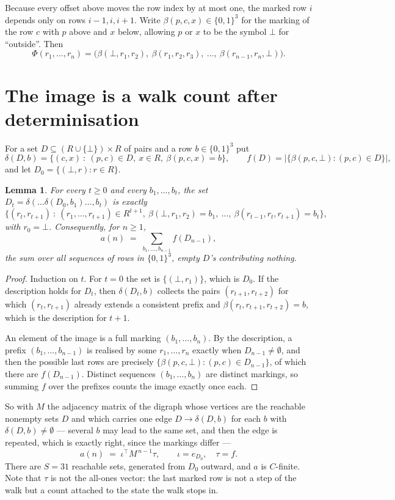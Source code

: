 \documentclass[11pt,a4paper]{article}
\theoremstyle{plain}
\newtheorem{lemma}[theorem]{Lemma}
\theoremstyle{definition}
\begin{document}
Because every offset above moves the row index by at most one, the marked row $i$ depends only
on rows $i-1,i,i+1$. Write $\beta(p,c,x)\in\{0,1\}^{3}$ for the marking of the row $c$
with $p$ above and $x$ below, allowing $p$ or $x$ to be the symbol $\bot$ for ``outside''.
Then
\[
\Phi(r_1,\dots,r_n)=\bigl(\beta(\bot,r_1,r_2),\ \beta(r_1,r_2,r_3),\ \dots,\
\beta(r_{n-1},r_n,\bot)\bigr).
\]

\section{The image is a walk count after determinisation}

For a set $D\subseteq(R\cup\{\bot\})\times R$ of pairs and a row $b\in\{0,1\}^{3}$ put
\[
\delta(D,b)=\{(c,x)\ :\ (p,c)\in D,\ x\in R,\ \beta(p,c,x)=b\},\qquad
f(D)=\bigl|\{\beta(p,c,\bot):(p,c)\in D\}\bigr| ,
\]
and let $D_0=\{(\bot,r):r\in R\}$.

\begin{lemma}\label{lem:det}
For every $t\ge0$ and every $b_1,\dots,b_t$, the set
$D_t=\delta(\dots\delta(D_0,b_1)\dots,b_t)$ is exactly
\[
\{(r_t,r_{t+1})\ :\ (r_1,\dots,r_{t+1})\in R^{t+1},\ \beta(\bot,r_1,r_2)=b_1,\ \dots,\
\beta(r_{t-1},r_t,r_{t+1})=b_t\} ,
\]
with $r_0=\bot$. Consequently, for $n\ge1$,
\[
a(n)\;=\;\sum_{b_1,\dots,b_{n-1}}f(D_{n-1}),
\]
the sum over all sequences of rows in $\{0,1\}^{3}$, empty $D$'s contributing nothing.
\end{lemma}

\begin{proof}
Induction on $t$. For $t=0$ the set is $\{(\bot,r_1)\}$, which is $D_0$. If the description
holds for $D_t$, then $\delta(D_t,b)$ collects the pairs $(r_{t+1},r_{t+2})$ for which
$(r_t,r_{t+1})$ already extends a consistent prefix and
$\beta(r_t,r_{t+1},r_{t+2})=b$, which is the description for $t+1$.

An element of the image is a full marking $(b_1,\dots,b_n)$. By the description, a prefix
$(b_1,\dots,b_{n-1})$ is realised by some $r_1,\dots,r_n$ exactly when $D_{n-1}\neq
\emptyset$, and then the possible last rows are precisely
$\{\beta(p,c,\bot):(p,c)\in D_{n-1}\}$, of which there are $f(D_{n-1})$. Distinct
sequences $(b_1,\dots,b_n)$ are distinct markings, so summing $f$ over the prefixes counts the
image exactly once each.
\end{proof}

So with $M$ the adjacency matrix of the digraph whose vertices are the reachable nonempty sets
$D$ and which carries one edge $D\to\delta(D,b)$ for each $b$ with $\delta(D,b)\neq\emptyset$
--- several $b$ may lead to the same set, and then the edge is repeated, which is exactly
right, since the markings differ ---
\[
a(n)\;=\;\iota^{\!\top}M^{\,n-1}\tau,\qquad \iota=e_{D_0},\quad \tau=f .
\]
There are $S=31$ reachable sets, generated from $D_0$ outward, and $a$ is $C$-finite. Note
that $\tau$ is not the all-ones vector: the last marked row is not a step of the walk but a
count attached to the state the walk stops in.
\end{document}

